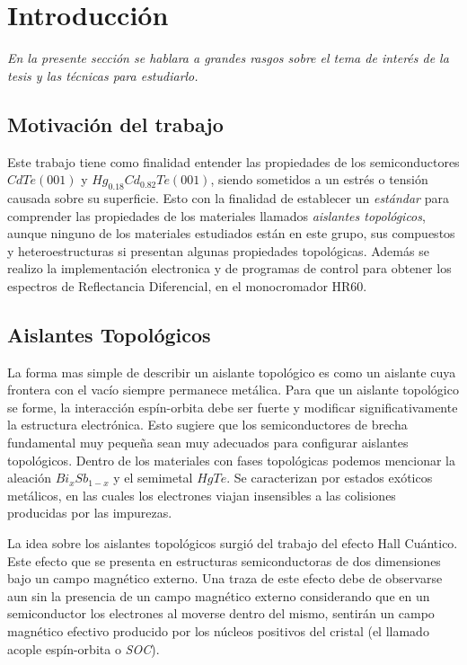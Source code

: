 \chapter{Introducción}
\label{chap:introduction}
\textit{En la presente sección se hablara a grandes rasgos sobre el tema de interés de la tesis
y las técnicas para estudiarlo.}
\vfill
\minitoc
\newpage

\section{Motivación del trabajo}
\label{ch1-why}
Este trabajo tiene como finalidad entender las propiedades de los semiconductores $ CdTe(001) $ y 
$ Hg_{0.18}Cd_{0.82}Te (001)$, siendo sometidos a un estrés o tensión causada sobre su superficie. Esto con la finalidad de establecer un \textit{estándar} para comprender las propiedades de los materiales llamados \textit{aislantes topológicos}, aunque ninguno de los materiales estudiados están en este grupo, sus compuestos y heteroestructuras si presentan algunas propiedades topológicas. Además se realizo la implementación electronica y de programas de control para obtener los espectros de Reflectancia Diferencial, en el monocromador HR60.

\section{Aislantes Topológicos}
\label{ch1-ti}
La forma mas simple de describir un aislante topológico es como un aislante cuya frontera con el vacío siempre permanece metálica. Para que un aislante topológico se forme, la interacción espín-orbita debe ser fuerte y modificar significativamente la estructura electrónica. Esto sugiere que los semiconductores de brecha fundamental muy pequeña sean muy adecuados para configurar aislantes topológicos. Dentro de los materiales con fases topológicas podemos mencionar la aleación $ Bi_{x}Sb_{1-x} $ y el semimetal $ HgTe $\cite{Konig2007}\cite{Moore2010}. Se caracterizan por estados exóticos metálicos, en las cuales los electrones viajan insensibles a las colisiones producidas por las impurezas\cite{Moore2010}\cite{Konig2007}.

La idea sobre los aislantes topológicos surgió del trabajo del efecto Hall Cuántico. Este efecto que se presenta en estructuras semiconductoras de dos dimensiones bajo un campo magnético externo\cite{Klitzing1980}. Una traza de este efecto debe de observarse aun sin la presencia de un campo magnético externo considerando que en un semiconductor los electrones al moverse dentro del mismo, sentirán un campo magnético efectivo producido por los núcleos positivos del cristal (el llamado acople espín-orbita o \textit{SOC}).

